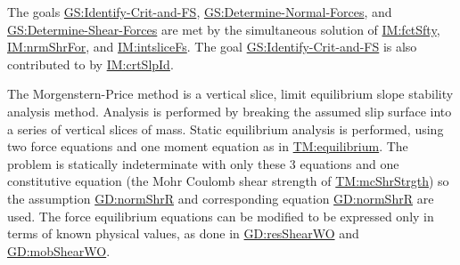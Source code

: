 \documentclass[12pt]{article}
\begin{document}
The goals \hyperref[identifyCritAndFS]{GS:Identify-Crit-and-FS}, \hyperref[determineNormalF]{GS:Determine-Normal-Forces}, and \hyperref[determineShearF]{GS:Determine-Shear-Forces} are met by the simultaneous solution of \hyperref[IM:fctSfty]{IM:fctSfty}, \hyperref[IM:nrmShrFor]{IM:nrmShrFor}, and \hyperref[IM:intsliceFs]{IM:intsliceFs}. The goal \hyperref[identifyCritAndFS]{GS:Identify-Crit-and-FS} is also contributed to by \hyperref[IM:crtSlpId]{IM:crtSlpId}.

The Morgenstern-Price method is a vertical slice, limit equilibrium slope stability analysis method. Analysis is performed by breaking the assumed slip surface into a series of vertical slices of mass. Static equilibrium analysis is performed, using two force equations and one moment equation as in \hyperref[TM:equilibrium]{TM:equilibrium}. The problem is statically indeterminate with only these 3 equations and one constitutive equation (the Mohr Coulomb shear strength of \hyperref[TM:mcShrStrgth]{TM:mcShrStrgth}) so the assumption \hyperref[GD:normShrR]{GD:normShrR} and corresponding equation \hyperref[GD:normShrR]{GD:normShrR} are used. The force equilibrium equations can be modified to be expressed only in terms of known physical values, as done in \hyperref[GD:resShearWO]{GD:resShearWO} and \hyperref[GD:mobShearWO]{GD:mobShearWO}.
\end{document}
